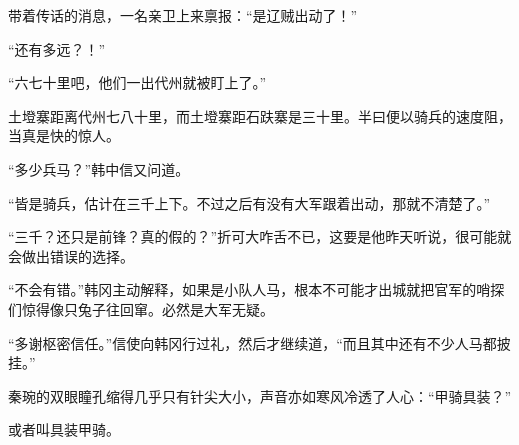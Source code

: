 带着传话的消息，一名亲卫上来禀报：“是辽贼出动了！”

“还有多远？！”

“六七十里吧，他们一出代州就被盯上了。”

土墱寨距离代州七八十里，而土墱寨距石趺寨是三十里。半曰便以骑兵的速度阻，当真是快的惊人。

“多少兵马？”韩中信又问道。

“皆是骑兵，估计在三千上下。不过之后有没有大军跟着出动，那就不清楚了。”

“三千？还只是前锋？真的假的？”折可大咋舌不已，这要是他昨天听说，很可能就会做出错误的选择。

“不会有错。”韩冈主动解释，如果是小队人马，根本不可能才出城就把官军的哨探们惊得像只兔子往回窜。必然是大军无疑。

“多谢枢密信任。”信使向韩冈行过礼，然后才继续道，“而且其中还有不少人马都披挂。”

秦琬的双眼瞳孔缩得几乎只有针尖大小，声音亦如寒风冷透了人心：“甲骑具装？”

或者叫具装甲骑。
